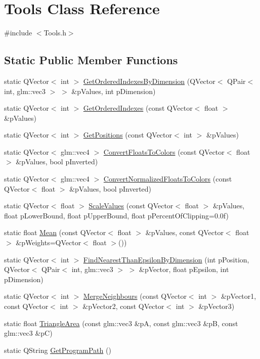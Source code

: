\hypertarget{class_tools}{\section{Tools Class Reference}
\label{class_tools}
}


{\ttfamily \#include $<$Tools.\+h$>$}

\subsection*{Static Public Member Functions}
\begin{DoxyCompactItemize}
\item 
static Q\+Vector$<$ int $>$ \hyperlink{class_tools_ae0b619c9e9c08c30094847760c942db0}{Get\+Ordered\+Indexes\+By\+Dimension} (Q\+Vector$<$ Q\+Pair$<$ int, glm\+::vec3 $>$ $>$ \&p\+Values, int p\+Dimension)
\item 
static Q\+Vector$<$ int $>$ \hyperlink{class_tools_a3506c0f27d83f2ebd449664df66b5459}{Get\+Ordered\+Indexes} (const Q\+Vector$<$ float $>$ \&p\+Values)
\item 
static Q\+Vector$<$ int $>$ \hyperlink{class_tools_a24bb86a8e42c993d9ad36e8895ed2727}{Get\+Positions} (const Q\+Vector$<$ int $>$ \&p\+Values)
\item 
static Q\+Vector$<$ glm\+::vec4 $>$ \hyperlink{class_tools_a735f9c58afb7b291d0a0a7d8de106f02}{Convert\+Floats\+To\+Colors} (const Q\+Vector$<$ float $>$ \&p\+Values, bool p\+Inverted)
\item 
static Q\+Vector$<$ glm\+::vec4 $>$ \hyperlink{class_tools_a513af853ac315a3d93ed12ab726c7a02}{Convert\+Normalized\+Floats\+To\+Colors} (const Q\+Vector$<$ float $>$ \&p\+Values, bool p\+Inverted)
\item 
static Q\+Vector$<$ float $>$ \hyperlink{class_tools_a27f3ce25d03612e754147a8f0be1793c}{Scale\+Values} (const Q\+Vector$<$ float $>$ \&p\+Values, float p\+Lower\+Bound, float p\+Upper\+Bound, float p\+Percent\+Of\+Clipping=0.\+0f)
\item 
static float \hyperlink{class_tools_aebedcc71427b4036db23ac98e6e047f7}{Mean} (const Q\+Vector$<$ float $>$ \&p\+Values, const Q\+Vector$<$ float $>$ \&p\+Weights=Q\+Vector$<$ float $>$())
\item 
static Q\+Vector$<$ int $>$ \hyperlink{class_tools_a86b9c89c467568778ad24529ed2ea3fb}{Find\+Nearest\+Than\+Epsilon\+By\+Dimension} (int p\+Position, Q\+Vector$<$ Q\+Pair$<$ int, glm\+::vec3 $>$ $>$ \&p\+Vector, float p\+Epsilon, int p\+Dimension)
\item 
static Q\+Vector$<$ int $>$ \hyperlink{class_tools_a8a8e778cc3d0f1522ec2a6330d760cf6}{Merge\+Neighbours} (const Q\+Vector$<$ int $>$ \&p\+Vector1, const Q\+Vector$<$ int $>$ \&p\+Vector2, const Q\+Vector$<$ int $>$ \&p\+Vector3)
\item 
static float \hyperlink{class_tools_aa4eba8890f192b82c56364622f2e047a}{Triangle\+Area} (const glm\+::vec3 \&p\+A, const glm\+::vec3 \&p\+B, const glm\+::vec3 \&p\+C)
\item 
static Q\+String \hyperlink{class_tools_a227a860b7656df69e68b11d9db3fae5e}{Get\+Program\+Path} ()
\end{DoxyCompactItemize}
